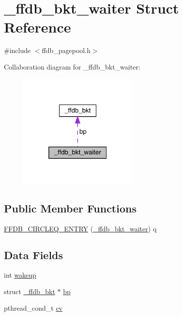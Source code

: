\hypertarget{struct__ffdb__bkt__waiter}{}\section{\+\_\+ffdb\+\_\+bkt\+\_\+waiter Struct Reference}
\label{struct__ffdb__bkt__waiter}


{\ttfamily \#include $<$ffdb\+\_\+pagepool.\+h$>$}



Collaboration diagram for \+\_\+ffdb\+\_\+bkt\+\_\+waiter\+:\nopagebreak
\begin{figure}[H]
\begin{center}
\leavevmode
\includegraphics[width=169pt]{d6/d97/struct__ffdb__bkt__waiter__coll__graph}
\end{center}
\end{figure}
\subsection*{Public Member Functions}
\begin{DoxyCompactItemize}
\item 
\mbox{\hyperlink{struct__ffdb__bkt__waiter_a46ff621e44918a826d983ac183c59c5c}{F\+F\+D\+B\+\_\+\+C\+I\+R\+C\+L\+E\+Q\+\_\+\+E\+N\+T\+RY}} (\mbox{\hyperlink{struct__ffdb__bkt__waiter}{\+\_\+ffdb\+\_\+bkt\+\_\+waiter}}) q
\end{DoxyCompactItemize}
\subsection*{Data Fields}
\begin{DoxyCompactItemize}
\item 
int \mbox{\hyperlink{struct__ffdb__bkt__waiter_a9677f7593396ca503610bd92c4430835}{wakeup}}
\item 
struct \mbox{\hyperlink{struct__ffdb__bkt}{\+\_\+ffdb\+\_\+bkt}} $\ast$ \mbox{\hyperlink{struct__ffdb__bkt__waiter_aa1e724eb12131337168b07b4ab071e01}{bp}}
\item 
pthread\+\_\+cond\+\_\+t \mbox{\hyperlink{struct__ffdb__bkt__waiter_a508c044094f22ad3c61725a3719147f3}{cv}}
\end{DoxyCompactItemize}


